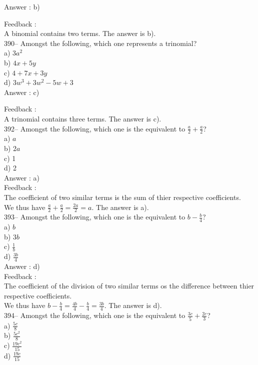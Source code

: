 ﻿\documentclass[letterpaper, 12pt]{article}
\begin{document}
Answer : b)

Feedback : \\
A binomial contains two terms. The answer is b).\\

390-- Amongst the following, which one represents a trinomial?\\
a) $3a^{2}$\\
b) $4x+5y$\\
c) $4+7x+3y$\\
d) $3w^{3}+3w^{2}-5w+3$\\

Answer : c)

Feedback : \\
A trinomial contains three terms. The answer is c).\\


392-- Amongst the following, which one is the equivalent to $\frac{a}{2}+\frac{a}{2}$?\\
a) $a$\\
b) $2a$\\
c) 1\\
d) 2\\

Answer : a)\\

Feedback : \\
The coefficient of two similar terms is the sum of thier respective coefficients.\\[2mm]
We thus have $\frac{a}{2}+\frac{a}{2}=\frac{2a}{2}=a$.  The answer is a).\\

393-- Amongst the following, which one is the equivalent to $b-\frac{b}{4}$?\\
a) $b$\\[2mm]
b) $3b$\\[2mm]
c) $\frac{1}{b}$\\[2mm]
d) $\frac{3b}{4}$\\

Answer : d)\\

Feedback : \\
The coefficient of the division of two similar terms os the difference between thier respective coefficients.\\[2mm]
We thus have $b-\frac{b}{4}=\frac{4b}{4}-\frac{b}{4}=\frac{3b}{4}$. The answer is d).\\

394-- Amongst the following, which one is the equivalent to
$\frac{3c}{5}+\frac{2c}{3}$?\\
a) $\frac{5c}{8}$\\[2mm]
b) $\frac{5c^{2}}{8}$\\[2mm]
c) $\frac{19c^{2}}{15}$\\[2mm]
d) $\frac{19c}{15}$\\
\end{document}
